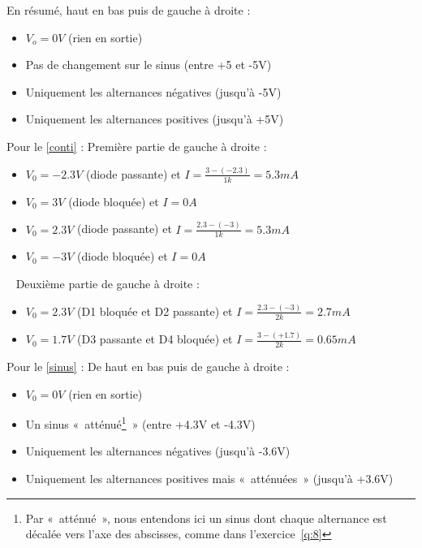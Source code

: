 \documentclass{../template/tp}
\begin{document}
{En résumé, haut en bas puis de gauche à droite :
    \begin{itemize}
        \item $V_o = 0V$ (rien en sortie)
        \item Pas de changement sur le sinus (entre +5 et -5V)
        \item Uniquement les alternances négatives (jusqu'à -5V)
        \item Uniquement les alternances positives (jusqu'à +5V)
    \end{itemize}
}

{%
Pour le \ref{conti} :
Première partie de gauche à droite :
\begin{itemize}
    \item $V_0 = -2.3V$ (diode passante) et $I = \frac{3-(-2.3)}{1k}=5.3mA$
    \item $V_0 = 3V$ (diode bloquée) et $I=0A$
    \item $V_0 = 2.3V$ (diode passante) et $I= \frac{2.3-(-3)}{1k}=5.3mA$
    \item $V_0 = -3V$ (diode bloquée) et $I = 0A$
\end{itemize}
~\newline
Deuxième partie de gauche à droite :
\begin{itemize}
    \item $V_0 = 2.3V$ (D1 bloquée et D2 passante) et $I = \frac{2.3-(-3)}{2k} = 2.7mA$
    \item $V_0 = 1.7V$ (D3 passante et D4 bloquée) et $I = \frac{3-(+1.7)}{2k} = 0.65mA$
\end{itemize}

Pour le \ref{sinus} :
De haut en bas puis de gauche à droite :
    \begin{itemize}
        \item $V_0 = 0V$ (rien en sortie)
        \item Un sinus «~atténué\footnote{Par «~atténué~», nous entendons ici un sinus dont chaque alternance est décalée vers l'axe des abscisses, comme dans l'exercice~\ref{q:8}}~» (entre +4.3V et -4.3V)
        \item Uniquement les alternances négatives (jusqu'à -3.6V)
        \item Uniquement les alternances positives mais «~atténuées~» (jusqu'à +3.6V)
    \end{itemize}
}
\end{document}
